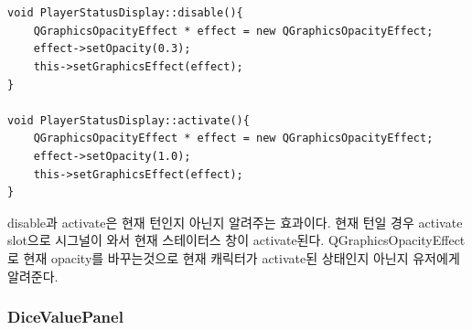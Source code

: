 \documentclass[10pt,oneside,a4paper,titlepage]{article}
\begin{document}
\begin{lstlisting}[frame=single,caption=
{PlayerStatusDisplay activate/hide},label=code:FD,captionpos=b,framexleftmargin=10pt,escapeinside=~~]


void PlayerStatusDisplay::disable(){
    QGraphicsOpacityEffect * effect = new QGraphicsOpacityEffect;
    effect->setOpacity(0.3);
    this->setGraphicsEffect(effect);
}

void PlayerStatusDisplay::activate(){
    QGraphicsOpacityEffect * effect = new QGraphicsOpacityEffect;
    effect->setOpacity(1.0);
    this->setGraphicsEffect(effect);
}
\end{lstlisting}

disable과 activate은 현재 턴인지 아닌지 알려주는 효과이다. 현재 턴일 경우 activate slot으로 시그널이 와서 현재 스테이터스 창이 activate된다. QGraphicsOpacityEffect로 현재 opacity를 바꾸는것으로 현재 캐릭터가 activate된 상태인지 아닌지 유저에게 알려준다. 


\subsubsection{DiceValuePanel}
\end{document}
